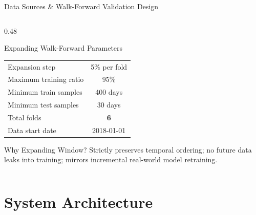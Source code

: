 \documentclass[aspectratio=43,11pt]{beamer}
\begin{document}
\begin{frame}[shrink=10]{Data Sources \& Walk-Forward Validation Design}
\begin{columns}[T]
\begin{column}{0.48\textwidth}
\begin{block}{Expanding Walk-Forward Parameters}
\begin{center}
\begin{tabular}{lc}
                    Expansion step & 5\% per fold \\
                    Maximum training ratio & 95\% \\
                    Minimum train samples & 400 days \\
                    Minimum test samples & 30 days \\
                    Total folds & \textbf{6} \\
                    Data start date & 2018-01-01 \\
                    \bottomrule
                \end{tabular}
                \end{center}
            \end{block}
            \begin{exampleblock}{Why Expanding Window?}
                \footnotesize Strictly preserves temporal ordering; no future data leaks into training; mirrors incremental real-world model retraining.
            \end{exampleblock}
        \end{column}
    \end{columns}
\end{frame}

\section{System Architecture}
\end{document}
